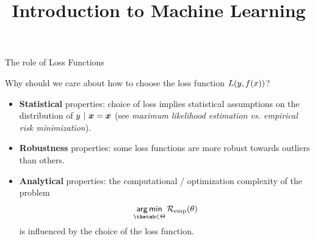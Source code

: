 





\usepackage{booktabs}

\newcommand{\titlefigure}{figure_man/vgg_example.png}
\newcommand{\learninggoals}{
  \item Know the concept of robustness 
  \item Learn about analytical and computational properties of loss functions 
  \item Understand that the loss function may influence convergence of the optimizer
}

\title{Introduction to Machine Learning}
\date{}






\begin{vbframe}{The role of Loss Functions}

Why should we care about how to choose the loss function $L(y, f(x))$?

\begin{itemize}
\item \textbf{Statistical} properties: choice of loss implies statistical assumptions on the distribution of $y ~|~ \bm{x} = \bm{x}$ (see \emph{maximum likelihood estimation vs.
empirical risk minimization}). 
\item \textbf{Robustness} properties: some loss functions are more robust towards outliers than others. 
\item \textbf{Analytical} properties: the computational / optimization complexity of the problem 
$$
\argmin_{\thetab \in \Theta} \risket
$$
is influenced by the choice of the loss function. 
\end{itemize}

\end{vbframe}

